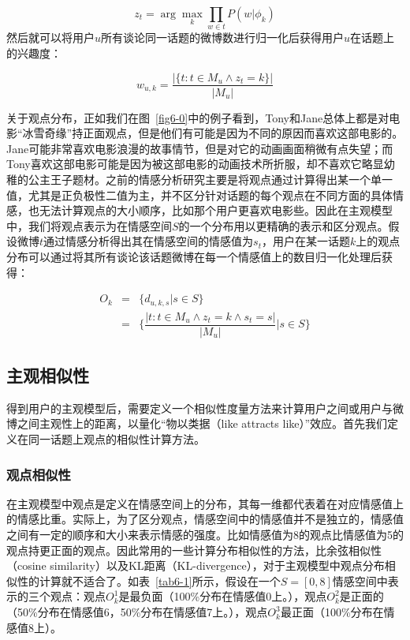 \begin{equation}
\label{twtopic}
z_{t} = \arg \max_{k}\prod_{w \in t} P(w|\phi_{k})
\end{equation}
然后就可以将用户$ u $所有谈论同一话题的微博数进行归一化后获得用户$ u $在话题上的兴趣度：

\begin{equation}
w_{u,k}=\dfrac{|\{ t: t \in M_{u} \wedge z_{t}=k\}|}{|M_{u}|}
\end{equation}

关于观点分布，正如我们在图~\ref{fig6-0}中的例子看到，Tony和Jane总体上都是对电影“冰雪奇缘”持正面观点，但是他们有可能是因为不同的原因而喜欢这部电影的。Jane可能非常喜欢电影浪漫的故事情节，但是对它的动画画面稍微有点失望；而Tony喜欢这部电影可能是因为被这部电影的动画技术所折服，却不喜欢它略显幼稚的公主王子题材。之前的情感分析研究主要是将观点通过计算得出某一个单一值，尤其是正负极性二值为主，并不区分针对话题的每个观点在不同方面的具体情感，也无法计算观点的大小顺序，比如那个用户更喜欢电影些。因此在主观模型中，我们将观点表示为在情感空间$ S $的一个分布用以更精确的表示和区分观点。假设微博$ t $通过情感分析得出其在情感空间的情感值为$ s_t $，用户在某一话题$ k $上的观点分布可以通过将其所有谈论该话题微博在每一个情感值上的数目归一化处理后获得：

\begin{eqnarray}
O_k &= & \{ d_{u,k,s}|s \in S \} \nonumber \\
  &=& \{ \dfrac{|t:t \in M_u \wedge z_t=k \wedge s_t=s|}{|M_u|}|s \in S\}
\end{eqnarray}

\subsection{主观相似性}
\label{similarity}

得到用户的主观模型后，需要定义一个相似性度量方法来计算用户之间或用户与微博之间主观性上的距离，以量化“物以类据（like attracts like）”效应。首先我们定义在同一话题上观点的相似性计算方法。
 
\subsubsection{观点相似性}
\label{opsim}

在主观模型中观点是定义在情感空间上的分布，其每一维都代表着在对应情感值上的情感比重。实际上，为了区分观点，情感空间中的情感值并不是独立的，情感值之间有一定的顺序和大小来表示情感的强度。比如情感值为8的观点比情感值为5的观点持更正面的观点。因此常用的一些计算分布相似性的方法，比余弦相似性（cosine similarity）以及KL距离（KL-divergence），对于主观模型中观点分布相似性的计算就不适合了。如表~\ref{tab6-1}所示，假设在一个$ S=[0,8 ] $情感空间中表示的三个观点：观点$ O_{k}^{1} $是最负面（100\%分布在情感值0上。），观点$ O_{k}^{2} $是正面的（50\%分布在情感值6，50\%分布在情感值7上。），观点$ O_{k}^{3} $最正面（100\%分布在情感值8上）。

